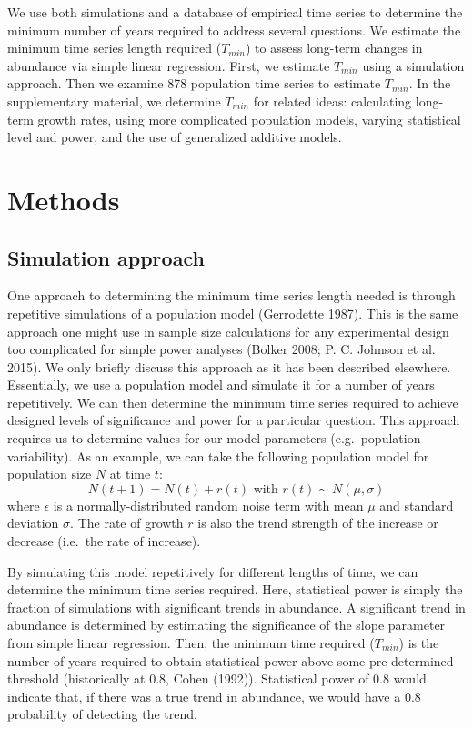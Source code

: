 \documentclass[12pt,]{article}
\begin{document}
We use both simulations and a database of empirical time series to
determine the minimum number of years required to address several
questions. We estimate the minimum time series length required
(\(T_{min}\)) to assess long-term changes in abundance via simple linear
regression. First, we estimate \(T_{min}\) using a simulation approach.
Then we examine 878 population time series to estimate \(T_{min}\). In
the supplementary material, we determine \(T_{min}\) for related ideas:
calculating long-term growth rates, using more complicated population
models, varying statistical level and power, and the use of generalized
additive models.

\section{Methods}\label{methods}

\subsection{Simulation approach}\label{simulation-approach}

One approach to determining the minimum time series length needed is
through repetitive simulations of a population model (Gerrodette 1987).
This is the same approach one might use in sample size calculations for
any experimental design too complicated for simple power analyses
(Bolker 2008; P. C. Johnson et al. 2015). We only briefly discuss this
approach as it has been described elsewhere. Essentially, we use a
population model and simulate it for a number of years repetitively. We
can then determine the minimum time series required to achieve designed
levels of significance and power for a particular question. This
approach requires us to determine values for our model parameters
(e.g.~population variability). As an example, we can take the following
population model for population size \(N\) at time \(t\): \[
N(t + 1) = N(t) + r(t) \mbox{ with } r(t) \sim N(\mu, \sigma)
\] where \(\epsilon\) is a normally-distributed random noise term with
mean \(\mu\) and standard deviation \(\sigma\). The rate of growth \(r\)
is also the trend strength of the increase or decrease (i.e.~the rate of
increase).

By simulating this model repetitively for different lengths of time, we
can determine the minimum time series required. Here, statistical power
is simply the fraction of simulations with significant trends in
abundance. A significant trend in abundance is determined by estimating
the significance of the slope parameter from simple linear regression.
Then, the minimum time required (\(T_{min}\)) is the number of years
required to obtain statistical power above some pre-determined threshold
(historically at 0.8, Cohen (1992)). Statistical power of 0.8 would
indicate that, if there was a true trend in abundance, we would have a
0.8 probability of detecting the trend.
\end{document}
